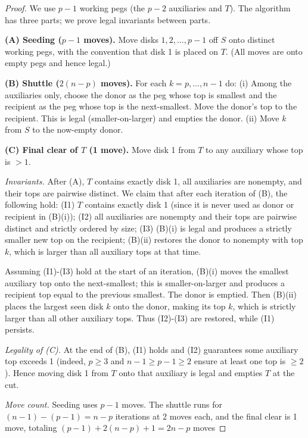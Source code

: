 \documentclass[11pt]{article}
\theoremstyle{definition}
\begin{document}
\begin{proof}
We use $p-1$ working pegs (the $p-2$ auxiliaries and $T$). The algorithm has three parts; we prove legal invariants between parts.

\textbf{(A) Seeding ($p-1$ moves).} Move disks $1, 2, \dots, p-1$ off $S$ onto distinct working pegs, with the convention that disk 1 is placed on $T$. (All moves are onto empty pegs and hence legal.)

\textbf{(B) Shuttle ($2(n-p)$ moves).} For each $k = p, \dots, n-1$ do: (i) Among the auxiliaries only, choose the donor as the peg whose top is smallest and the recipient as the peg whose top is the next-smallest. Move the donor's top to the recipient. This is legal (smaller-on-larger) and empties the donor. (ii) Move $k$ from $S$ to the now-empty donor.

\textbf{(C) Final clear of $T$ (1 move).} Move disk 1 from $T$ to any auxiliary whose top is $> 1$.

\emph{Invariants.} After (A), $T$ contains exactly disk 1, all auxiliaries are nonempty, and their tops are pairwise distinct. We claim that after each iteration of (B), the following hold: (I1) $T$ contains exactly disk 1 (since it is never used as donor or recipient in (B)(i)); (I2) all auxiliaries are nonempty and their tops are pairwise distinct and strictly ordered by size; (I3) (B)(i) is legal and produces a strictly smaller new top on the recipient; (B)(ii) restores the donor to nonempty with top $k$, which is larger than all auxiliary tops at that time.

Assuming (I1)-(I3) hold at the start of an iteration, (B)(i) moves the smallest auxiliary top onto the next-smallest; this is smaller-on-larger and produces a recipient top equal to the previous smallest. The donor is emptied. Then (B)(ii) places the largest seen disk $k$ onto the donor, making its top $k$, which is strictly larger than all other auxiliary tops. Thus (I2)-(I3) are restored, while (I1) persists.

\emph{Legality of (C).} At the end of (B), (I1) holds and (I2) guarantees some auxiliary top exceeds 1 (indeed, $p \geq 3$ and $n-1 \geq p-1 \geq 2$ ensure at least one top is $\geq 2$). Hence moving disk 1 from $T$ onto that auxiliary is legal and empties $T$ at the cut.

\emph{Move count.} Seeding uses $p-1$ moves. The shuttle runs for $(n-1) - (p-1) = n-p$ iterations at 2 moves each, and the final clear is 1 move, totaling $(p-1) + 2(n-p) + 1 = 2n - p$ moves

\end{proof}
\end{document}
